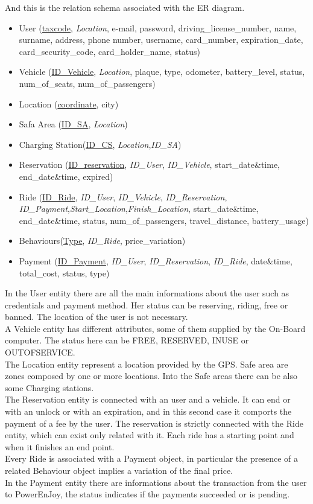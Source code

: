  And this is the relation schema associated with the ER diagram.
\begin{itemize} 
	\item{User (\underline{taxcode}, \textit{Location}, e-mail, password, driving\_license\_number, name, surname, address, phone number, username, card\_number, expiration\_date, card\_security\_code, card\_holder\_name, status)} %
	\item{Vehicle (\underline{ID\_Vehicle}, \textit{Location}, plaque, type, odometer, battery\_level, status, num\_of\_seats, num\_of\_passengers) }
	\item{Location (\underline{coordinate}, city)}	
	\item{Safa Area (\underline{ID\_SA}, \textit{Location})} %
	\item{Charging Station(\underline{ID\_CS}, \textit{Location},\textit{ID\_SA})}
	\item{Reservation (\underline{ID\_reservation}, \textit{ID\_User}, \textit{ID\_Vehicle}, start\_date\&time, end\_date\&time, expired)}
	\item{Ride (\underline{ID\_Ride}, \textit{ID\_User}, \textit{ID\_Vehicle}, \textit{ID\_Reservation}, \textit{ID\_Payment},\textit{Start\_Location},\textit{Finish\_Location}, start\_date\&time, end\_date\&time, status, num\_of\_passengers, travel\_distance, battery\_usage)}
	\item{Behaviours(\underline{Type}, \textit{ID\_Ride}, price\_variation)}
	\item{Payment (\underline{ID\_Payment}, \textit{ID\_User}, \textit{ID\_Reservation}, \textit{ID\_Ride}, date\&time, total\_cost, status, type)}
\end{itemize}
In the User entity there are all the main informations about the user such as credentials and payment method. Her status can be reserving, riding, free or banned. The location of the user is not necessary.
\\A Vehicle entity has different attributes, some of them supplied by the On-Board computer. The status here can be FREE, RESERVED, INUSE or OUTOFSERVICE.
\\The Location entity represent a location provided by the GPS. Safe area are zones composed by one or more locations. Into the Safe areas there can be also some Charging stations.
\\The Reservation entity is connected with an user and a vehicle. It can end or with an unlock or with an expiration, and in this second case it comports the payment of a fee by the user. The reservation is strictly connected with the Ride entity, which can exist only related with it. Each ride has a starting point and when it finishes an end point. 
\\Every Ride is associated with a Payment object, in particular the presence of a related Behaviour object implies a variation of the final price. 
\\In the Payment entity there are informations about the transaction from the user to PowerEnJoy, the status indicates if the payments succeeded or is pending.
